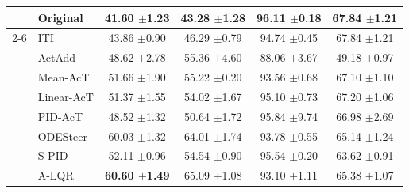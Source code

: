 \documentclass{article}
\theoremstyle{plain}
\theoremstyle{definition}
\theoremstyle{remark}
\begin{document}
\begin{table}[H]
\begin{threeparttable}
\begin{tabular}{ll|>{\columncolor{lightblue}}ccc|c}
    & Original & 41.60 {\tiny $\pm$1.23} & 43.28 {\tiny $\pm$1.28} & 96.11 {\tiny $\pm$0.18} & 67.84 {\tiny $\pm$1.21} \\
    \cmidrule(lr){2-6}
    \multirow{7}{*}{\rotatebox{90}{Qwen-2.5-3B}} 
    & ITI & 43.86 {\tiny $\pm$0.90} & 46.29 {\tiny $\pm$0.79} & 94.74 {\tiny $\pm$0.45} & 67.84 {\tiny $\pm$1.21} \\
    & ActAdd & 48.62 {\tiny $\pm$2.78} & 55.36 {\tiny $\pm$4.60} & 88.06 {\tiny $\pm$3.67} & 49.18 {\tiny $\pm$0.97}\\
    & Mean-AcT & 51.66 {\tiny $\pm$1.90} & 55.22 {\tiny $\pm$0.20} & 93.56 {\tiny $\pm$0.68} & 67.10 {\tiny $\pm$1.10} \\
    & Linear-AcT & 51.37 {\tiny $\pm$1.55} & 54.02 {\tiny $\pm$1.67} & 95.10 {\tiny $\pm$0.73} & 67.20 {\tiny $\pm$1.06} \\
    & PID-AcT & 48.52 {\tiny $\pm$1.32} & 50.64 {\tiny $\pm$1.72} & 95.84 {\tiny $\pm$9.74} & 66.98 {\tiny $\pm$2.69}\\
    & ODESteer & 60.03 {\tiny $\pm$1.32} & 64.01 {\tiny $\pm$1.74} & 93.78 {\tiny $\pm$0.55} & 65.14 {\tiny $\pm$1.24} \\
    & S-PID &  52.11 {\tiny $\pm$0.96} & 54.54 {\tiny $\pm$0.90} & 95.54 {\tiny $\pm$0.20} & 63.62 {\tiny $\pm$0.91} \\
    & A-LQR &  \textbf{60.60 {\tiny $\pm$1.49}} & 65.09 {\tiny $\pm$1.08} & 93.10 {\tiny $\pm$1.11} & 65.38 {\tiny $\pm$1.07}  \\

    \midrule


\end{tabular}
\end{threeparttable}
\end{table}
\end{document}
